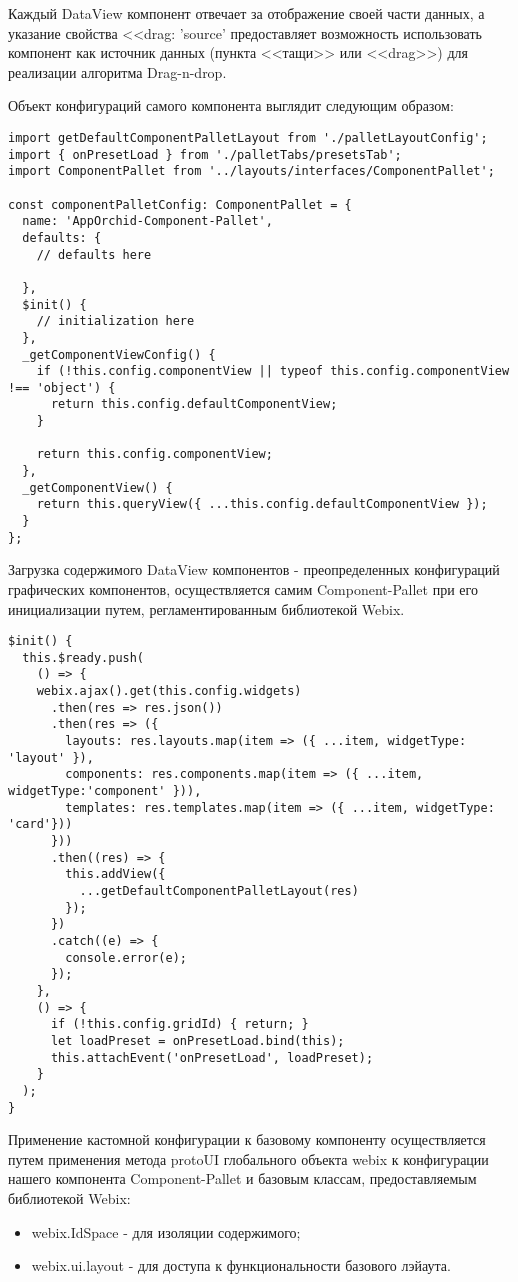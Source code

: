 Каждый DataView компонент отвечает за отображение своей части данных, а указание свойства <<drag: 'source' предоставляет возможность использовать компонент как источник данных (пункта <<тащи>> или <<drag>>) для реализации алгоритма Drag-n-drop.

Объект конфигураций самого компонента выглядит следующим образом:

\begin{lstlisting}
import getDefaultComponentPalletLayout from './palletLayoutConfig';
import { onPresetLoad } from './palletTabs/presetsTab';
import ComponentPallet from '../layouts/interfaces/ComponentPallet';

const componentPalletConfig: ComponentPallet = {
  name: 'AppOrchid-Component-Pallet',
  defaults: {
    // defaults here

  },
  $init() {
    // initialization here
  },
  _getComponentViewConfig() {
    if (!this.config.componentView || typeof this.config.componentView !== 'object') {
      return this.config.defaultComponentView;
    }

    return this.config.componentView;
  },
  _getComponentView() {
    return this.queryView({ ...this.config.defaultComponentView });
  }
};
\end{lstlisting}

Загрузка содержимого DataView компонентов - преопределенных конфигураций графических компонентов, осуществляется самим Component-Pallet при его инициализации путем, регламентированным библиотекой Webix.

\begin{lstlisting}
$init() {
  this.$ready.push(
    () => {
    webix.ajax().get(this.config.widgets)
      .then(res => res.json())
      .then(res => ({
        layouts: res.layouts.map(item => ({ ...item, widgetType: 'layout' }),
        components: res.components.map(item => ({ ...item, widgetType:'component' })),
        templates: res.templates.map(item => ({ ...item, widgetType: 'card'}))
      }))
      .then((res) => {
        this.addView({
          ...getDefaultComponentPalletLayout(res)
        });
      })
      .catch((e) => {
        console.error(e);
      });
    },
    () => {
      if (!this.config.gridId) { return; }
      let loadPreset = onPresetLoad.bind(this);
      this.attachEvent('onPresetLoad', loadPreset);
    }
  );
}
\end{lstlisting}

Применение кастомной конфигурации к базовому компоненту осуществляется путем применения метода protoUI глобального объекта webix к конфигурации нашего компонента Component-Pallet и базовым классам, предоставляемым библиотекой Webix:
\begin{itemize}
    \item webix.IdSpace - для изоляции содержимого;
    \item webix.ui.layout - для доступа к функциональности базового лэйаута.
\end{itemize}

